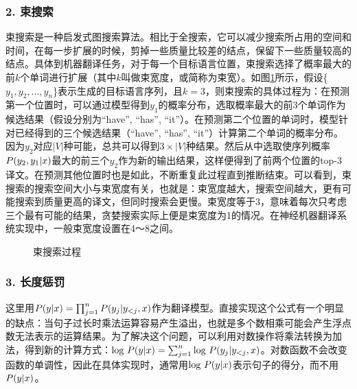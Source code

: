 \subsubsection{2. 束搜索}
\vspace{0.5em}

\parinterval 束搜索是一种启发式图搜索算法。相比于全搜索，它可以减少搜索所占用的空间和时间，在每一步扩展的时候，剪掉一些质量比较差的结点，保留下一些质量较高的结点。具体到机器翻译任务，对于每一个目标语言位置，束搜索选择了概率最大的前$k$个单词进行扩展（其中$k$叫做束宽度，或简称为束宽）。如图\ref{fig:10-31}所示，假设\{$y_1, y_2,..., y_n$\}表示生成的目标语言序列，且$k=3$，则束搜索的具体过程为：在预测第一个位置时，可以通过模型得到$y_1$的概率分布，选取概率最大的前3个单词作为候选结果（假设分别为“have”, “has”, “it”）。在预测第二个位置的单词时，模型针对已经得到的三个候选结果（“have”, “has”, “it”）计算第二个单词的概率分布。因为$y_2$对应$|V|$种可能，总共可以得到$3 \times |V|$种结果。然后从中选取使序列概率${P}(y_2,y_1| {{x}})$最大的前三个$y_2$作为新的输出结果，这样便得到了前两个位置的top-3译文。在预测其他位置时也是如此，不断重复此过程直到推断结束。可以看到，束搜索的搜索空间大小与束宽度有关，也就是：束宽度越大，搜索空间越大，更有可能搜索到质量更高的译文，但同时搜索会更慢。束宽度等于3，意味着每次只考虑三个最有可能的结果，贪婪搜索实际上便是束宽度为1的情况。在神经机器翻译系统实现中，一般束宽度设置在4～8之间。

\begin{figure}[htp]
\centering

\caption{束搜索过程}
\label{fig:10-31}
\end{figure}


\subsubsection{3. 长度惩罚}

\parinterval 这里用$ {P} ({{y}} | {{x}}) = \prod_{j=1}^n {P}(y_j | {{y}}_{<j},{{x}}) $作为翻译模型。直接实现这个公式有一个明显的缺点：当句子过长时乘法运算容易产生溢出，也就是多个数相乘可能会产生浮点数无法表示的运算结果。为了解决这个问题，可以利用对数操作将乘法转换为加法，得到新的计算方式：$\textrm{log } {P}({{y}} | {{x}}) = \sum_{j=1}^n \textrm{log }{P} (y_j | {{y}}_{<j}, {{x}}) $。对数函数不会改变函数的单调性，因此在具体实现时，通常用$\textrm{log }{P} ({{y}} | {{x}})$表示句子的得分，而不用${P}({{y}} | {{x}})$。

